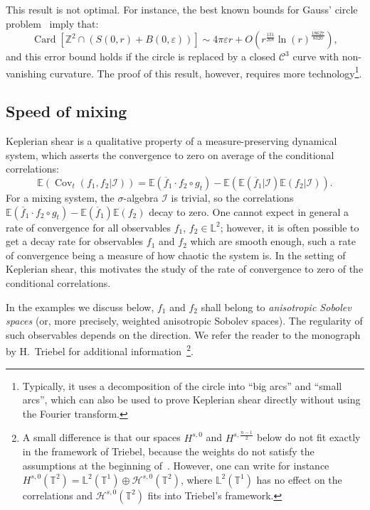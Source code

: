 \documentclass[10pt]{amsart}
\theoremstyle{definition}\newtheorem{defi}[theo]{Definition}\newtheorem{rema}[theo]{Remark}\newtheorem{exam}[theo]{Example}\newtheorem{exem}[theo]{Example}\newtheorem{nota}[theo]{Notation}
\DeclareMathOperator{\Card}{Card}
\DeclareMathOperator{\Cov}{Cov}
\newcommand{\Z}{\mathbb{Z}}
\newcommand{\Ebb}{\mathbb{E}}
\newcommand{\Lbb}{\mathbb{L}}
\newcommand{\Tbb}{\mathbb{T}}
\newcommand{\Ccal}{\mathcal{C}}
\newcommand{\Hcal}{\mathcal{H}}
\newcommand{\Ical}{\mathcal{I}}
\begin{document}

This result is not optimal. For instance, the best known bounds for Gauss' circle problem~\cite{Huxley:2003} imply that:
\[
\Card \left[\Z^2 \cap (S(0,r)+B(0,\varepsilon))\right]
\sim 4 \pi \varepsilon r + O (r^\frac{131}{208} \ln (r)^{\frac{18627}{8320}}),
\]
and this error bound holds if the circle is replaced by a closed $\Ccal^3$ curve with non-vanishing curvature. The proof of this result, however, requires more technology\footnote{Typically, it uses a decomposition of the circle into ``big arcs'' and ``small arcs'', which can also be used to prove Keplerian shear directly without using the Fourier transform.}.



\subsection{Speed of mixing}\label{subsec:Speed}

Keplerian shear is a qualitative property of a measure-preserving dynamical system, which asserts the convergence to zero on average of the conditional correlations:
\begin{equation}
\Ebb (\Cov_t (f_1, f_2|\Ical)) = \Ebb (\overline{f}_1 \cdot f_2 \circ g_t) - \Ebb(\Ebb(\overline{f}_1|\Ical) \Ebb(f_2|\Ical)).
\end{equation}
For a mixing system, the $\sigma$-algebra $\Ical$ is trivial, so the correlations $\Ebb (\overline{f}_1 \cdot f_2 \circ g_t) - \Ebb(\overline{f}_1) \Ebb(f_2)$ decay to zero. One cannot expect in general a rate of convergence for all observables $f_1$, $f_2 \in \Lbb^2$; however, it is often possible to get a decay rate for observables $f_1$ and $f_2$ which are smooth enough, such a rate of convergence being a measure of how chaotic the system is. In the setting of Keplerian shear, this motivates the study of the rate of convergence to zero of the conditional correlations.


In the examples we discuss below, $f_1$ and $f_2$ shall belong to
\emph{anisotropic Sobolev spaces} (or, more precisely, weighted anisotropic Sobolev spaces). The regularity of such observables depends on the direction. We refer the reader to the monograph by H.~Triebel for additional information~\cite[Chapters~5-6]{Triebel:2006}\footnote{A small difference is that our spaces $H^{s,0}$ and $H^{s,\frac{n-1}{2}}$ below do not fit exactly in the framework of Triebel, because the weights do not satisfy the assumptions at the beginning of~\cite[Chapters~6]{Triebel:2006}. However, one can write for instance $H^{s,0} (\Tbb^2) = \Lbb^2 (\Tbb^1) \oplus \Hcal^{s,0} (\Tbb^2)$, where $\Lbb^2 (\Tbb^1)$ has no effect on the correlations and $\Hcal^{s,0} (\Tbb^2)$ fits into Triebel's framework.}.
\end{document}
